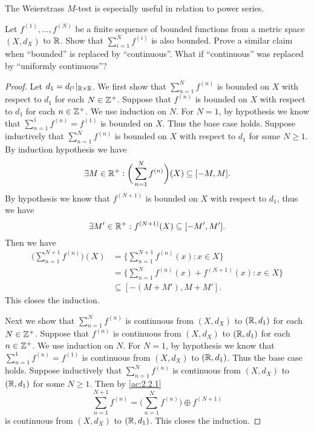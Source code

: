 \begin{note}
  The Weierstrass \(M\)-test is especially useful in relation to power series.
\end{note}

\exercisesection

\begin{ex}\label{ex:3.5.1}
  Let \(f^{(1)}, \dots, f^{(N)}\) be a finite sequence of bounded functions from a metric space \((X, d_X)\) to \(\mathbb{R}\).
  Show that \(\sum_{i = 1}^N f^{(i)}\) is also bounded.
  Prove a similar claim when ``bounded'' is replaced by ``continuous''.
  What if ``continuous'' was replaced by ``uniformly continuous''?
\end{ex}

\begin{proof}
  Let \(d_1 = d_{l^1}|_{\mathbb{R} \times \mathbb{R}}\).
  We first show that \(\sum_{n = 1}^N f^{(n)}\) is bounded on \(X\) with respect to \(d_1\) for each \(N \in \mathbb{Z}^+\).
  Suppose that \(f^{(n)}\) is bounded on \(X\) with respect to \(d_1\) for each \(n \in \mathbb{Z}^+\).
  We use induction on \(N\).
  For \(N = 1\), by hypothesis we know that \(\sum_{n = 1}^1 f^{(n)} = f^{(1)}\) is bounded on \(X\).
  Thus the base case holds.
  Suppose inductively that \(\sum_{n = 1}^N f^{(n)}\) is bounded on \(X\) with respect to \(d_1\) for some \(N \geq 1\).
  By induction hypothesis we have
  \[
    \exists M \in \mathbb{R}^+ : \bigg(\sum_{n = 1}^N f^{(n)}\bigg)(X) \subseteq [-M, M].
  \]
  By hypothesis we know that \(f^{(N + 1)}\) is bounded on \(X\) with respect to \(d_1\), thus we have
  \[
    \exists M' \in \mathbb{R}^+ : f^{(N + 1)}(X) \subseteq [-M', M'].
  \]
  Then we have
  \begin{align*}
    \bigg(\sum_{n = 1}^{N + 1} f^{(n)}\bigg)(X) & = \bigg\{\sum_{n = 1}^{N + 1} f^{(n)}(x) : x \in X\bigg\}            \\
                                                & = \bigg\{\sum_{n = 1}^N f^{(n)}(x) + f^{(N + 1)}(x) : x \in X\bigg\} \\
                                                & \subseteq [-(M + M'), M + M'].
  \end{align*}
  This closes the induction.

  Next we show that \(\sum_{n = 1}^N f^{(n)}\) is continuous from \((X, d_X)\) to \((\mathbb{R}, d_1)\) for each \(N \in \mathbb{Z}^+\).
  Suppose that \(f^{(n)}\) is continuous from \((X, d_X)\) to \((\mathbb{R}, d_1)\) for each \(n \in \mathbb{Z}^+\).
  We use induction on \(N\).
  For \(N = 1\), by hypothesis we know that \(\sum_{n = 1}^1 f^{(n)} = f^{(1)}\) is continuous from \((X, d_X)\) to \((\mathbb{R}, d_1)\).
  Thus the base case holds.
  Suppose inductively that \(\sum_{n = 1}^N f^{(n)}\) is continuous from \((X, d_X)\) to \((\mathbb{R}, d_1)\) for some \(N \geq 1\).
  Then by \cref{ac:2.2.1}
  \[
    \sum_{n = 1}^{N + 1} f^{(n)} = \bigg(\sum_{n = 1}^N f^{(n)}\bigg) \oplus f^{(N + 1)}
  \]
  is continuous from \((X, d_X)\) to \((\mathbb{R}, d_1)\).
  This closes the induction.


\end{proof}
